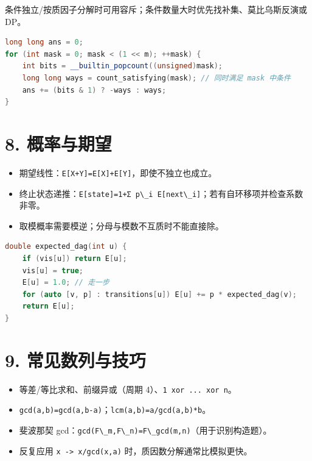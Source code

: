 条件独立/按质因子分解时可用容斥；条件数量大时优先找补集、莫比乌斯反演或 DP。

\begin{lstlisting}[language={C++}]
long long ans = 0;
for (int mask = 0; mask < (1 << m); ++mask) {
    int bits = __builtin_popcount((unsigned)mask);
    long long ways = count_satisfying(mask); // 同时满足 mask 中条件
    ans += (bits & 1) ? -ways : ways;
}
\end{lstlisting}

\section{8. 概率与期望}\label{ux6982ux7387ux4e0eux671fux671b}

\begin{itemize}
\tightlist
\item
  期望线性：\passthrough{\lstinline!E[X+Y]=E[X]+E[Y]!}，即使不独立也成立。
\item
  终止状态递推：\passthrough{\lstinline!E[state]=1+Σ p\_i E[next\_i]!}；若有自环移项并检查系数非零。
\item
  取模概率需要模逆；分母与模数不互质时不能直接除。
\end{itemize}

\begin{lstlisting}[language={C++}]
double expected_dag(int u) {
    if (vis[u]) return E[u];
    vis[u] = true;
    E[u] = 1.0; // 走一步
    for (auto [v, p] : transitions[u]) E[u] += p * expected_dag(v);
    return E[u];
}
\end{lstlisting}

\section{9. 常见数列与技巧}\label{ux5e38ux89c1ux6570ux5217ux4e0eux6280ux5de7}

\begin{itemize}
\tightlist
\item
  等差/等比求和、前缀异或（周期 4）、\passthrough{\lstinline!1 xor ... xor n!}。
\item
  \passthrough{\lstinline!gcd(a,b)=gcd(a,b-a)!}；\passthrough{\lstinline!lcm(a,b)=a/gcd(a,b)*b!}。
\item
  斐波那契 gcd：\passthrough{\lstinline!gcd(F\_m,F\_n)=F\_gcd(m,n)!}（用于识别构造题）。
\item
  反复应用 \passthrough{\lstinline!x -> x/gcd(x,a)!} 时，质因数分解通常比模拟更快。
\end{itemize}


